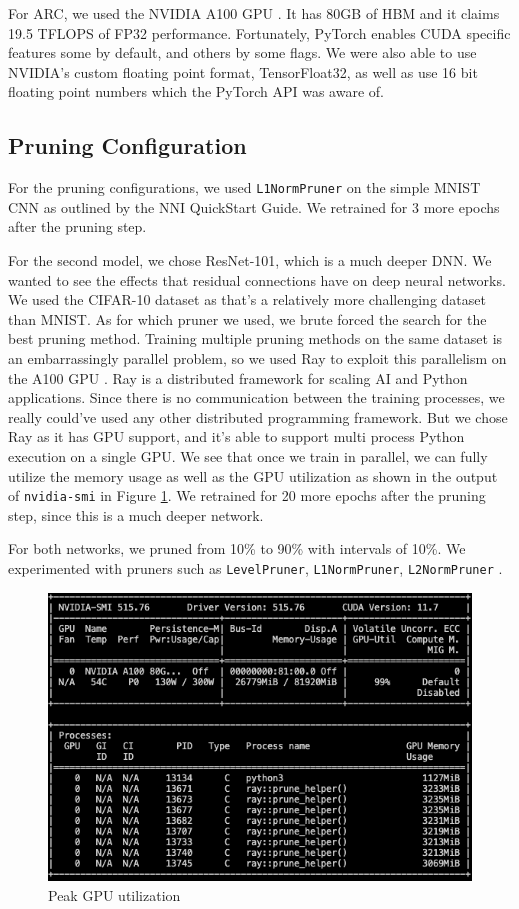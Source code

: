 \documentclass{article}
\begin{document}
For ARC, we used the NVIDIA A100 GPU \cite{a100}. It has 80GB of HBM and it claims 19.5 TFLOPS of FP32 performance. Fortunately, PyTorch enables CUDA specific features some by default, and others by some flags. We were also able to use NVIDIA's custom floating point format, TensorFloat32, as well as use 16 bit floating point numbers which the PyTorch API was aware of.


\subsection{Pruning Configuration}
For the pruning configurations, we used \verb|L1NormPruner| on the simple MNIST CNN as outlined by the NNI QuickStart Guide. We retrained for 3 more epochs after the pruning step.

For the second model, we chose ResNet-101, which is a much deeper DNN. We wanted to see the effects that residual connections have on deep neural networks. We used the CIFAR-10 dataset as that's a relatively more challenging dataset than MNIST. As for which pruner we used, we brute forced the search for the best pruning method. Training multiple pruning methods on the same dataset is an embarrassingly parallel problem, so we used Ray to exploit this parallelism on the A100 GPU \cite{ray}. Ray is a distributed framework for scaling AI and Python applications. Since there is no communication between the training processes, we really could've used any other distributed programming framework. But we chose Ray as it has GPU support, and it's able to support multi process Python execution on a single GPU. We see that once we train in parallel, we can fully utilize the memory usage as well as the GPU utilization as shown in the output of \verb|nvidia-smi| in Figure \ref{fig:nvidiasmi}. We retrained for 20 more epochs after the pruning step, since this is a much deeper network.

For both networks, we pruned from 10\% to 90\% with intervals of 10\%. We experimented with pruners such as \verb|LevelPruner|, \verb|L1NormPruner|, \verb|L2NormPruner| \cite{levelpruner, l1prune}.

\begin{figure}
    \centerline{\includegraphics[width=6in]{../proj1/figures/nvidia-smi_pruning.png}}
    \caption{Peak GPU utilization}
    \label{fig:nvidiasmi}
\end{figure}
\end{document}
